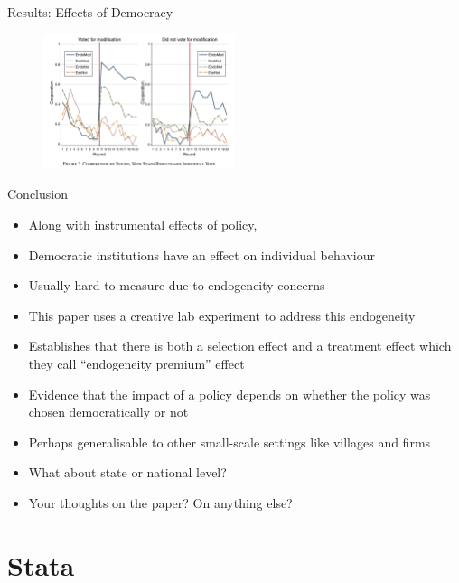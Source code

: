 \documentclass[11pt,notes=hide,aspectratio=169,mathserif]{beamer}
\begin{document}
\begin{frame}{Results: Effects of Democracy}
\begin{figure}
\centering
\includegraphics[width=0.5\textwidth]{inputs/fig3.png}
\end{figure}
\end{frame}

\begin{frame}{Conclusion}
\begin{itemize}
    \item Along with instrumental effects of policy,
    \pause \item Democratic institutions have an effect on individual behaviour 
    \pause \item Usually hard to measure due to endogeneity concerns 
    \pause \item This paper uses a creative lab experiment to address this endogeneity
    \pause \item Establishes that there is both a selection effect and a treatment effect which they call ``endogeneity premium'' effect 
    \pause \item Evidence that the impact of a policy depends on whether the policy was chosen democratically or not
    \pause \item Perhaps generalisable to other small-scale settings like villages and firms 
    \pause \item What about state or national level? 
    \pause \item Your thoughts on the paper? On anything else? 
\end{itemize}
\end{frame}

\section*{Stata}
\end{document}
